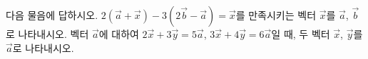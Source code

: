 다음 물음에 답하시오.
 $2(\vec{a}+\vec{x})-3(2\vec{b}-\vec{a})=\vec{x}$를 만족시키는 벡터 $\vec{x}$를 $\vec{a}$, $\vec{b}$로 나타내시오.
 벡터 $\vec{a}$에 대하여 $2\vec{x}+3\vec{y}=5\vec{a}$, $3\vec{x}+4\vec{y}=6\vec{a}$일 때, 두 벡터 $\vec{x}$, $\vec{y}$를 $\vec{a}$로 나타내시오.
